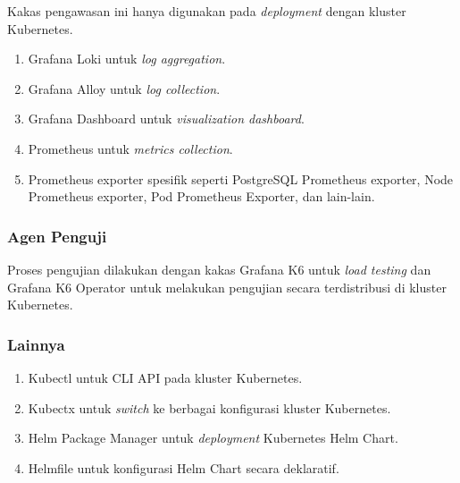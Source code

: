 Kakas pengawasan ini hanya digunakan pada \textit{deployment} dengan kluster Kubernetes.

\begin{enumerate}
    \item Grafana Loki untuk \textit{log aggregation}.
    \item Grafana Alloy untuk \textit{log collection}.
    \item Grafana Dashboard untuk \textit{visualization dashboard}.
    \item Prometheus untuk \textit{metrics collection}.
    \item Prometheus exporter spesifik seperti PostgreSQL Prometheus exporter, Node Prometheus exporter, Pod Prometheus Exporter, dan lain-lain.
\end{enumerate}

\subsubsection{Agen Penguji}

Proses pengujian dilakukan dengan kakas Grafana K6 untuk \textit{load testing} dan Grafana K6 Operator untuk melakukan pengujian secara terdistribusi di kluster Kubernetes.

\subsubsection{Lainnya}

\begin{enumerate}
    \item Kubectl untuk CLI API pada kluster Kubernetes.
    \item Kubectx untuk \textit{switch} ke berbagai konfigurasi kluster Kubernetes.
    \item Helm Package Manager untuk \textit{deployment} Kubernetes Helm Chart.
    \item Helmfile untuk konfigurasi Helm Chart secara deklaratif.
\end{enumerate}